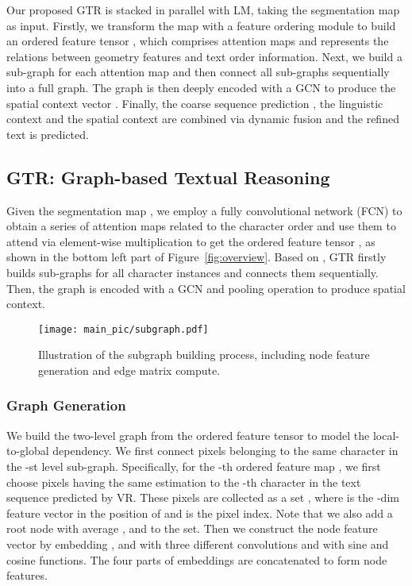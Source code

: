 \documentclass[letterpaper]{article} \usepackage{aaai22}  \usepackage{times}  \usepackage{helvet}  \usepackage{courier}  \usepackage[hyphens]{url}  \usepackage{graphicx} \urlstyle{rm} \def\UrlFont{\rm}  \usepackage{natbib}  \usepackage{caption} \DeclareCaptionStyle{ruled}{labelfont=normalfont,labelsep=colon,strut=off} \frenchspacing  \setlength{\pdfpagewidth}{8.5in}  \setlength{\pdfpageheight}{11in}
\begin{document}
Our proposed GTR is stacked in parallel with LM, taking the segmentation map  as input. Firstly, we transform the map  with a feature ordering module to build an ordered feature tensor , which comprises  attention maps and represents the relations between geometry features and text order information. Next, we build a sub-graph for each attention map and then connect all sub-graphs sequentially into a full graph. The graph is then deeply encoded with a GCN to produce the spatial context vector . Finally, the coarse sequence prediction , the linguistic context  and the spatial context  are combined via dynamic fusion and the refined text is predicted.



\subsection{GTR: Graph-based Textual Reasoning}
\label{subsec:gtr}
Given the segmentation map , we employ a fully convolutional network (FCN) to obtain a series of attention maps related to the character order and use them to attend  via element-wise multiplication to get the ordered feature tensor , as shown in the bottom left part of Figure~\ref{fig:overview}. Based on , GTR firstly builds sub-graphs for all character instances and connects them sequentially. Then, the graph is encoded with a GCN and pooling operation to produce spatial context.

\begin{figure}[t]
	\centering
	\texttt{[image: main\_pic/subgraph.pdf]}
    \caption{Illustration of the subgraph building process, including node feature generation and edge matrix compute.}
	\label{fig:graph}
\end{figure}



\subsubsection{Graph Generation}

We build the two-level graph from the ordered feature tensor  to model the local-to-global dependency. We first connect pixels belonging to the same character in the -st level sub-graph. Specifically, for the -th ordered feature map , we first choose pixels having the same estimation to the -th character in the text sequence predicted by VR. These pixels are collected as a set , where  is the -dim feature vector in the position  of  and  is the pixel index. Note that we also add a root node with average ,  and  to the set. Then we construct the node feature vector  by embedding ,  and  with three different  convolutions and  with sine and cosine functions. The four parts of embeddings are concatenated to form node features.
\end{document}
